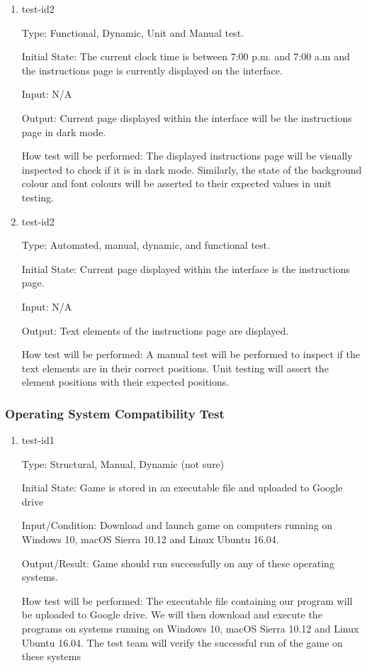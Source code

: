 \documentclass[12pt, titlepage]{article}
\begin{document}
\begin{enumerate}
		
		\item{test-id2\\}
		
		Type: Functional, Dynamic, Unit and Manual test.
		
		Initial State:  The current clock time is between 7:00 p.m. and 7:00 a.m and the instructions page is currently displayed on the interface.
		
		Input: N/A
		
		Output: Current page displayed within the interface will be the instructions page in dark mode.
		
		How test will be performed: The displayed instructions page will be visually inspected to check if it is in dark mode. Similarly, the state of the background colour and font colours will be asserted to their expected values in unit testing. 
		
		
		
		\item{test-id2\\}
		
		Type: Automated, manual, dynamic, and functional test.
		
		Initial State: Current page displayed within the interface is the instructions page.
		
		Input: N/A
		
		Output: Text elements of the instructions page are displayed.
		
		How test will be performed: A manual test will be performed to inspect if the text elements are in their correct positions. Unit testing will assert the element positions with their expected positions. 
		
	\end{enumerate}
	
	\subsubsection{Operating System Compatibility Test}
	
	\begin{enumerate}
		
		\item{test-id1\\}
		
		
		Type: Structural, Manual, Dynamic (not sure)
		
		Initial State: Game is stored in an executable file and uploaded to Google drive
		
		Input/Condition: Download and launch game on computers running on  Windows 10, macOS Sierra 10.12 and Linux Ubuntu 16.04.
		
		Output/Result: Game should run successfully on any of these operating systems.
		
		How test will be performed: The executable file containing our program will be uploaded to Google drive.
		We will then download and execute the programs on systems running on Windows 10, macOS Sierra 10.12 and Linux Ubuntu 16.04. The test team will verify the successful run of the game on these systems
	\end{enumerate}
	
\end{document}

